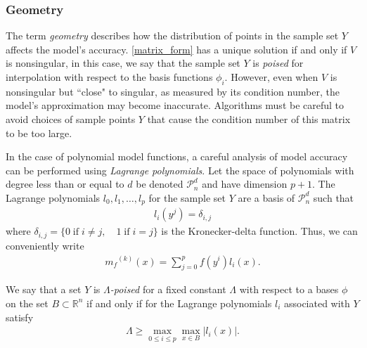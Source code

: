 \documentclass{article}
\theoremstyle{case}
\numberwithin{theorem}{subsection}
\newcommand{\mfk}{{{m}_f}^{(k)}}
\newcommand{\polydn}{\mathcal{P}^d_n}
\newcommand{\Rn}{\mathbb R^n}
\begin{document}


\subsubsection{Geometry}
\label{geometry}
The term \emph{geometry} describes how the distribution of points in the sample set $Y$ affects the model's accuracy.
\cref{matrix_form} has a unique solution if and only if $V$ is nonsingular, in this case, we say that the sample set $Y$ is \emph{poised} for interpolation with respect to the basis functions $\phi_i$.
However, even when $V$ is nonsingular but ``close" to singular, as measured by its condition number, the model's approximation may become inaccurate.
Algorithms must be careful to avoid choices of sample points $Y$ that cause the condition number of this matrix to be too large.

In the case of polynomial model functions, a careful analysis of model accuracy can be performed using \emph{Lagrange polynomials}.
Let the space of polynomials with degree less than or equal to $d$ be denoted $\polydn$ and have dimension $p+1$.
The Lagrange polynomials $l_0, l_1, \ldots, l_p$ for the sample set $Y$ are a basis of $\polydn$ such that
\begin{align*}
l_i(y^j) = \delta_{i,j}
\end{align*}
where $\delta_{i,j} = \{0 \;\text{if}\; i\ne j,\quad 1 \;\text{if} \; i = j \}$ is the Kronecker-delta function.
Thus, we can conveniently write
\begin{align}
\label{reg}
\mfk(x) = \sum^p_{j=0}f(y^i)l_i(x).
\end{align}

We say that a set $Y$ is \emph{$\Lambda$-poised} for a fixed constant $\Lambda$ with respect to a bases $\phi$ on the set 
$B \subset\Rn$ if and only if for the Lagrange polynomials $l_i$ associated with $Y$ satisfy
\begin{align}
\Lambda \ge \max_{0\le i\le p}\max_{x\in B}|l_i(x)|.
\end{align}
\end{document}
